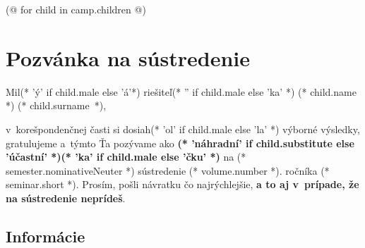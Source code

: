 \documentclass[12pt, twoside]{article}
\begin{document}
    \pagestyle{main}
    
    (@ for child in camp.children @)
    \thispagestyle{first}
    \section{Pozvánka na sústredenie}
    Mil(* 'ý' if child.male else 'á'*) riešiteľ(* '' if child.male else 'ka' *) (* child.name *) (* child.surname *),

    v~korešpondenčnej časti si dosiah(* 'ol' if child.male else 'la' *) výborné výsledky,
    gratulujeme a~týmto Ťa pozývame ako \textbf{(* 'náhradní' if child.substitute else 'účastní' *)(* 'ka' if child.male else 'čku' *)}
    na (* semester.nominativeNeuter *) sústredenie (* volume.number *). ročníka (* seminar.short *).
    Prosím, pošli návratku čo najrýchlejšie, \textbf{a to aj v~prípade, že na sústredenie neprídeš}.

    \subsection{Informácie}
\end{document}
